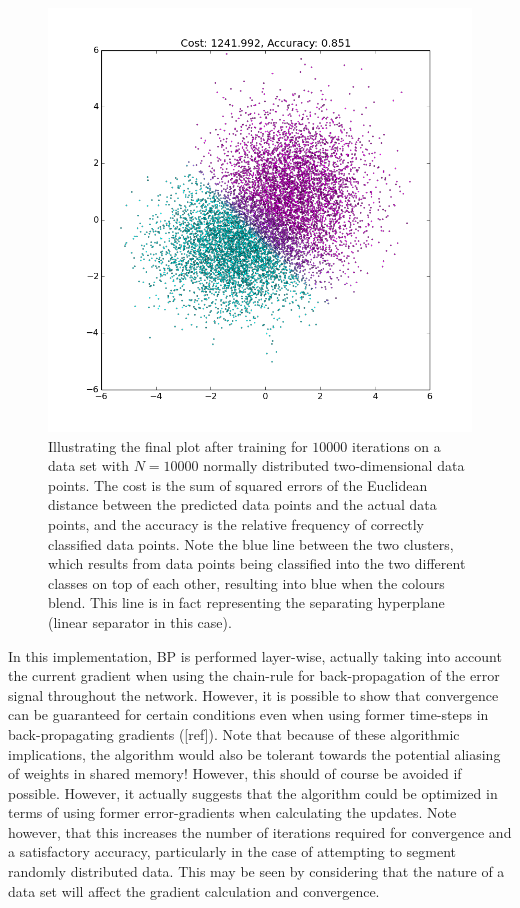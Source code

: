 \begin{figure}
\centering
\includegraphics[width=12cm]{fig/MLP_cluster_N_10000_1kiter}
\caption{Illustrating the final plot after training for $10 000$ iterations on a data set with $N=10 000$ normally distributed two-dimensional data points. The cost is the sum of squared errors of the Euclidean distance between the predicted data points and the actual data points, and the accuracy is the relative frequency of correctly classified data points. Note the blue line between the two clusters, which results from data points being classified into the two different classes on top of each other, resulting into blue when the colours blend. This line is in fact representing the separating hyperplane (linear separator in this case).}
\label{fig:theano_mlp_demo}
\end{figure}

In this implementation, BP is performed layer-wise, actually taking into account the current gradient when using the chain-rule for back-propagation of the error signal throughout the network. 
However, it is possible to show that convergence can be guaranteed for certain conditions even when using former time-steps in back-propagating gradients ([ref]). Note that because of these algorithmic implications, the algorithm would also be tolerant towards the potential aliasing of weights in shared memory! However, this should of course be avoided if possible.
However, it actually suggests that the algorithm could be optimized in terms of using former error-gradients when calculating the updates. Note however, that this increases the number of iterations required for convergence and a satisfactory accuracy, particularly in the case of attempting to segment randomly distributed data. This may be seen by considering that the nature of a data set will affect the gradient calculation and convergence.

\cleardoublepage